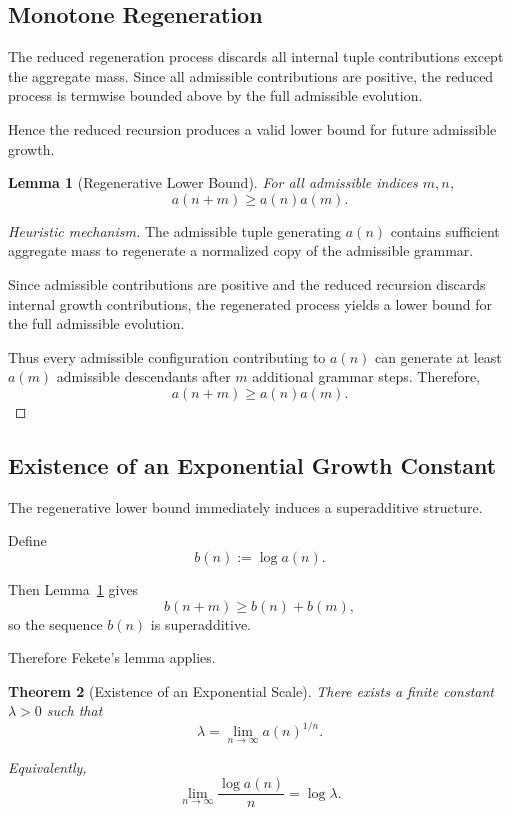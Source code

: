 \documentclass[12pt, oneside]{article}
\numberwithin{equation}{section}
\theoremstyle{definition}
\theoremstyle{plain}
\newtheorem{theorem}{Theorem}[section]
\newtheorem{lemma}[theorem]{Lemma}
\theoremstyle{remark}
\begin{document}
\subsection{Monotone Regeneration}

The reduced regeneration process discards all internal tuple contributions
except the aggregate mass.  Since all admissible contributions are positive,
the reduced process is termwise bounded above by the full admissible evolution.

Hence the reduced recursion produces a valid lower bound for future
admissible growth.

\begin{lemma}[Regenerative Lower Bound]
\label{lem:regenerative-lower-bound}
For all admissible indices $m,n$,
\[
a(n+m)\ge a(n)a(m).
\]
\end{lemma}

\begin{proof}[Heuristic mechanism]
The admissible tuple generating $a(n)$ contains sufficient aggregate mass
to regenerate a normalized copy of the admissible grammar.

Since admissible contributions are positive and the reduced recursion
discards internal growth contributions, the regenerated process yields
a lower bound for the full admissible evolution.

Thus every admissible configuration contributing to $a(n)$ can generate
at least $a(m)$ admissible descendants after $m$ additional grammar steps.
Therefore,
\[
a(n+m)\ge a(n)a(m).
\]
\end{proof}

\subsection{Existence of an Exponential Growth Constant}

The regenerative lower bound immediately induces a superadditive structure.

Define
\[
b(n):=\log a(n).
\]

Then Lemma~\ref{lem:regenerative-lower-bound} gives
\[
b(n+m)\ge b(n)+b(m),
\]
so the sequence $b(n)$ is superadditive.

Therefore Fekete's lemma applies.

\begin{theorem}[Existence of an Exponential Scale]
\label{thm:existence-lambda}
There exists a finite constant $\lambda>0$ such that
\[
\lambda
=
\lim_{n\to\infty} a(n)^{1/n}.
\]

Equivalently,
\[
\lim_{n\to\infty}\frac{\log a(n)}{n}
=
\log\lambda.
\]
\end{theorem}
\end{document}
